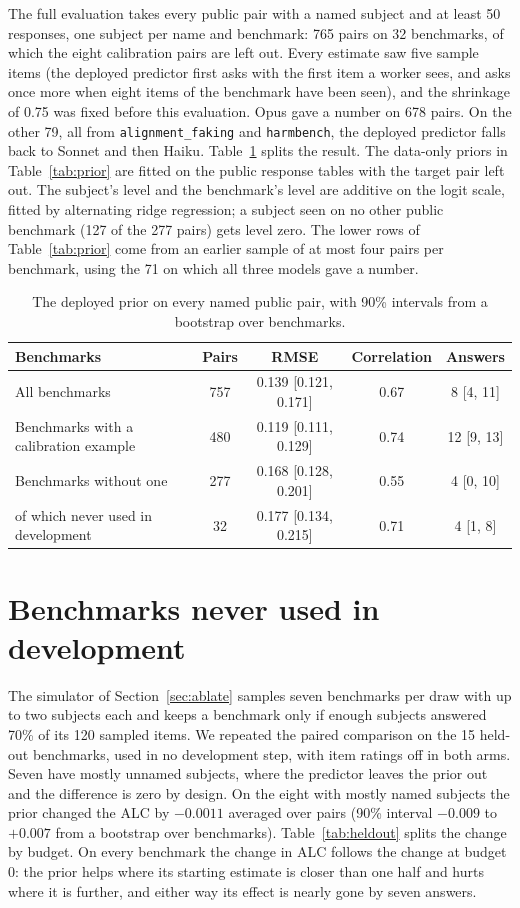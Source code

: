 \documentclass{article}
\begin{document}
The full evaluation takes every public pair with a named subject and at least 50 responses, one subject per name and benchmark: 765 pairs on 32 benchmarks, of which the eight calibration pairs are left out. Every estimate saw five sample items (the deployed predictor first asks with the first item a worker sees, and asks once more when eight items of the benchmark have been seen), and the shrinkage of 0.75 was fixed before this evaluation. Opus gave a number on 678 pairs. On the other 79, all from \texttt{alignment\_faking} and \texttt{harmbench}, the deployed predictor falls back to Sonnet and then Haiku. Table~\ref{tab:priordep} splits the result. The data-only priors in Table~\ref{tab:prior} are fitted on the public response tables with the target pair left out. The subject's level and the benchmark's level are additive on the logit scale, fitted by alternating ridge regression; a subject seen on no other public benchmark (127 of the 277 pairs) gets level zero. The lower rows of Table~\ref{tab:prior} come from an earlier sample of at most four pairs per benchmark, using the 71 on which all three models gave a number.

\begin{table}[h]
\centering
\caption{The deployed prior on every named public pair, with 90\% intervals from a bootstrap over benchmarks.}
\label{tab:priordep}
\small
\begin{tabular}{lcccc}
\toprule
Benchmarks & Pairs & RMSE & Correlation & Answers \\
\midrule
All benchmarks & 757 & 0.139 [0.121, 0.171] & 0.67 & 8 [4, 11] \\
Benchmarks with a calibration example & 480 & 0.119 [0.111, 0.129] & 0.74 & 12 [9, 13] \\
Benchmarks without one & 277 & 0.168 [0.128, 0.201] & 0.55 & 4 [0, 10] \\
\quad of which never used in development & 32 & 0.177 [0.134, 0.215] & 0.71 & 4 [1, 8] \\
\bottomrule
\end{tabular}
\end{table}

\section{Benchmarks never used in development}
\label{app:heldout}

The simulator of Section~\ref{sec:ablate} samples seven benchmarks per draw with up to two subjects each and keeps a benchmark only if enough subjects answered 70\% of its 120 sampled items. We repeated the paired comparison on the 15 held-out benchmarks, used in no development step, with item ratings off in both arms. Seven have mostly unnamed subjects, where the predictor leaves the prior out and the difference is zero by design. On the eight with mostly named subjects the prior changed the ALC by $-0.0011$ averaged over pairs (90\% interval $-0.009$ to $+0.007$ from a bootstrap over benchmarks). Table~\ref{tab:heldout} splits the change by budget. On every benchmark the change in ALC follows the change at budget 0: the prior helps where its starting estimate is closer than one half and hurts where it is further, and either way its effect is nearly gone by seven answers.
\end{document}
